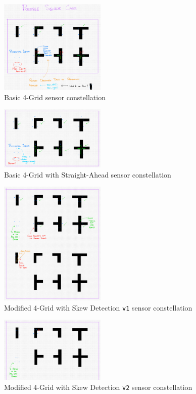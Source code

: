 \documentclass[conference]{IEEEtran}
\begin{document}
\begin{figure}[htbp]
	\centerline{\includegraphics[width=0.45\textwidth]{constellation-basic-4-grid.png}}
	\caption{Basic 4-Grid sensor constellation}
	\label{fig:constellation-basic-4-grid}
\end{figure}
\begin{figure}[htbp]
	\centerline{\includegraphics[width=0.45\textwidth]{constellation-basic-4-straight.png}}
	\caption{Basic 4-Grid with Straight-Ahead sensor constellation}
	\label{fig:constellation-basic-4-straight}
\end{figure}
\begin{figure}[htbp]
	\centerline{\includegraphics[width=0.45\textwidth]{constellation-4-skew-v1.png}}
	\caption{Modified 4-Grid with Skew Detection \texttt{v1} sensor constellation}
	\label{fig:constellation-4-skew-v1}
\end{figure}
\begin{figure}[htbp]
	\centerline{\includegraphics[width=0.45\textwidth]{constellation-4-skew-v2.png}}
	\caption{Modified 4-Grid with Skew Detection \texttt{v2} sensor constellation}
	\label{fig:constellation-4-skew-v2}
\end{figure}
\end{document}

